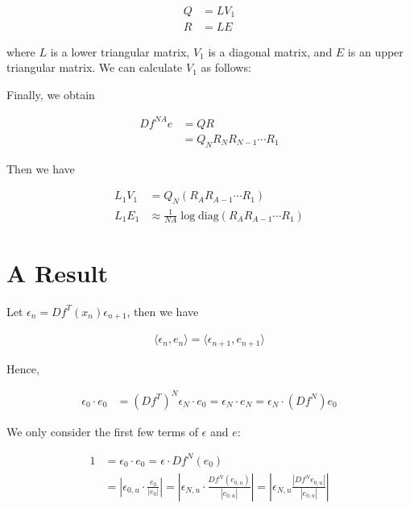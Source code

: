 \documentclass{article}
\begin{document}
\begin{align}
    Q &= LV_1 \\
    R &= LE
\end{align}

where $L$ is a lower triangular matrix, $V_1$ is a diagonal matrix, and $E$ is an upper triangular matrix. We can calculate $V_1$ as follows:

Finally, we obtain

\begin{align}
    Df^{NA}e &= QR \\
    &= Q_NR_NR_{N-1}\cdots R_1
\end{align}

Then we have

\begin{align}
    L_1V_1 &= Q_N(R_AR_{A-1}\cdots R_1) \\
    L_1E_1 &\approx \frac{1}{NA} \log \text{diag}(R_A R_{A-1}\cdots R_1)
\end{align}

\section*{A Result}

Let $\epsilon_n = Df^T(x_n)\epsilon_{n+1}$, then we have

\begin{align}
    \langle \epsilon_n , e_n \rangle = \langle \epsilon_{n+1} , e_{n+1} \rangle
\end{align}

Hence,

\begin{align}
    \epsilon_0 \cdot e_0 &= (Df^T)^N \epsilon_N \cdot e_0 = \epsilon_N \cdot e_N = \epsilon_N \cdot (Df^N)e_0
\end{align}

We only consider the first few terms of $\epsilon$ and $e$:

\begin{align}
    1 &= \epsilon_0 \cdot e_0 = \epsilon \cdot Df^N(e_0) \\
    &= |\epsilon_{0,u} \cdot \frac{e_0}{|e_0|}| = |\epsilon_{N,u} \cdot \frac{Df^N(e_{0,u})}{|e_{0,u}|}| = |\epsilon_{N,u} \frac{|Df^N{e_{0,u}}|}{|e_{0,u}|}|
\end{align}
\end{document}

